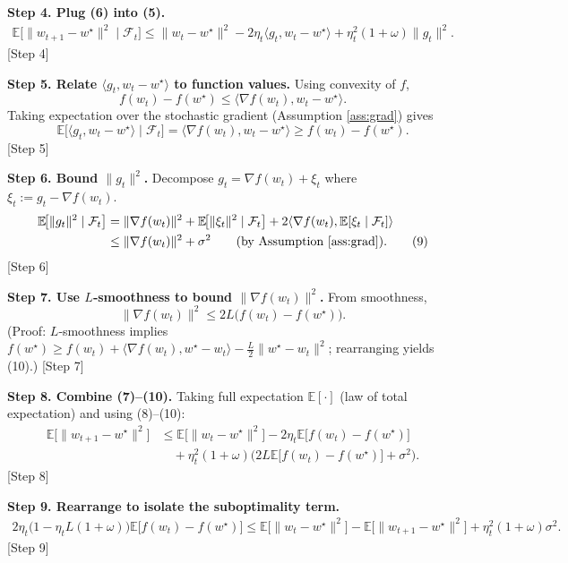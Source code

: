 \documentclass{article}
\begin{document}
\noindent\textbf{Step 4. Plug (6) into (5).}
\begin{align}
\mathbb{E}\!\big[\|w_{t+1}-w^{\star}\|^{2}\mid\mathcal{F}_t\big]
\le
\|w_t-w^{\star}\|^{2}
-2\eta_t\langle g_t,w_t-w^{\star}\rangle
+\eta_t^{2}(1+\omega)\|g_t\|^{2}. \tag{7}
\end{align}
[Step 4]

\noindent\textbf{Step 5. Relate $\langle g_t,w_t-w^{\star}\rangle$ to function values.}  
Using convexity of $f$,
\[
f(w_t)-f(w^{\star})\le\langle \nabla f(w_t),w_t-w^{\star}\rangle .
\]
Taking expectation over the stochastic gradient (Assumption \ref{ass:grad}) gives
\[
\mathbb{E}\!\big[\langle g_t,w_t-w^{\star}\rangle\mid\mathcal{F}_t\big]
= \langle \nabla f(w_t),w_t-w^{\star}\rangle
\ge f(w_t)-f(w^{\star}). \tag{8}
\]
[Step 5]

\noindent\textbf{Step 6. Bound $\|g_t\|^{2}$.}  
Decompose $g_t=\nabla f(w_t)+\xi_t$ where $\xi_t:=g_t-\nabla f(w_t)$.
\[
\begin{aligned}
\mathbb{E}\!\big[\|g_t\|^{2}\mid\mathcal{F}_t\big]
&= \|\nabla f(w_t)\|^{2}
+\mathbb{E}\!\big[\|\xi_t\|^{2}\mid\mathcal{F}_t\big]
+2\langle\nabla f(w_t),\mathbb{E}[\xi_t\mid\mathcal{F}_t]\rangle\\
&\le \|\nabla f(w_t)\|^{2}+\sigma^{2}\qquad\text{(by Assumption \ref{ass:grad})}. \tag{9}
\end{aligned}
\]
[Step 6]

\noindent\textbf{Step 7. Use $L$‑smoothness to bound $\|\nabla f(w_t)\|^{2}$.}  
From smoothness,
\[
\|\nabla f(w_t)\|^{2}\le 2L\big(f(w_t)-f(w^{\star})\big). \tag{10}
\]
(Proof: $L$‑smoothness implies $f(w^{\star})\ge f(w_t)+\langle\nabla f(w_t),w^{\star}-w_t\rangle-\frac{L}{2}\|w^{\star}-w_t\|^{2}$; rearranging yields (10).)  
[Step 7]

\noindent\textbf{Step 8. Combine (7)–(10).}  
Taking full expectation $\mathbb{E}[\cdot]$ (law of total expectation) and using (8)–(10):
\[
\begin{aligned}
\mathbb{E}\!\big[\|w_{t+1}-w^{\star}\|^{2}\big]
&\le \mathbb{E}\!\big[\|w_t-w^{\star}\|^{2}\big]
-2\eta_t\mathbb{E}\!\big[f(w_t)-f(w^{\star})\big]  \\
&\quad +\eta_t^{2}(1+\omega)\Big( 2L\mathbb{E}\!\big[f(w_t)-f(w^{\star})\big]+\sigma^{2}\Big). \tag{11}
\end{aligned}
\]
[Step 8]

\noindent\textbf{Step 9. Rearrange to isolate the suboptimality term.}
\[
\begin{aligned}
2\eta_t\Big(1-\eta_t L(1+\omega)\Big)\mathbb{E}\!\big[f(w_t)-f(w^{\star})\big]
\le
\mathbb{E}\!\big[\|w_t-w^{\star}\|^{2}\big]
-\mathbb{E}\!\big[\|w_{t+1}-w^{\star}\|^{2}\big]
+\eta_t^{2}(1+\omega)\sigma^{2}. \tag{12}
\end{aligned}
\]
[Step 9]
\end{document}
